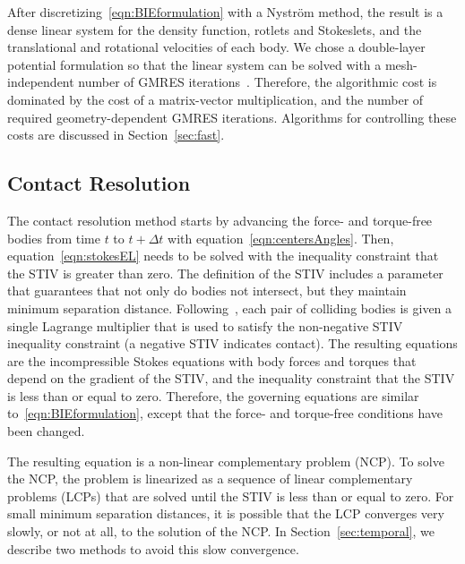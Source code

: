 \documentclass[AMA,STIX1COL]{WileyNJD-v2}
\begin{document}
After discretizing~\eqref{eqn:BIEformulation} with a Nystr\"om method,
the result is a dense linear system for the density function, rotlets
and Stokeslets, and the translational and rotational velocities of each
body.  We chose a double-layer potential formulation so that the linear
system can be solved with a mesh-independent number of GMRES
iterations~\cite{Campbell1996}.  Therefore, the algorithmic cost is
dominated by the cost of a matrix-vector multiplication, and the number
of required geometry-dependent GMRES iterations.  Algorithms for
controlling these costs are discussed in Section~\ref{sec:fast}.

\subsection{Contact Resolution}
\label{sec:contact}
The contact resolution method starts by advancing the force- and
torque-free bodies from time $t$ to $t + \Delta t$ with
equation~\eqref{eqn:centersAngles}.  Then, equation~\eqref{eqn:stokesEL}
needs to be solved with the inequality constraint that the STIV is
greater than zero.  The definition of the STIV includes a parameter that
guarantees that not only do bodies not intersect, but they maintain
minimum separation distance. Following~\cite{Lu2017}, each pair of
colliding bodies is given a single Lagrange multiplier that is used to
satisfy the non-negative STIV inequality constraint (a negative STIV
indicates contact).  The resulting equations are the incompressible
Stokes equations with body forces and torques that depend on the
gradient of the STIV, and the inequality constraint that the STIV is
less than or equal to zero.  Therefore, the governing equations are
similar to~\eqref{eqn:BIEformulation}, except that the force- and
torque-free conditions have been changed.

The resulting equation is a non-linear complementary problem (NCP). To
solve the NCP, the problem is linearized as a sequence of linear
complementary problems (LCPs) that are solved until the STIV is less
than or equal to zero.  For small minimum separation distances, it is
possible that the LCP converges very slowly, or not at all, to the
solution of the NCP.  In Section~\ref{sec:temporal}, we describe two
methods to avoid this slow convergence.
\end{document}
